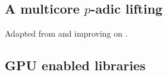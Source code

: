 \subsection{A multicore $p$-adic lifting}

Adapted from and improving on \cite{ChSt05}.

\subsection{GPU enabled libraries}






